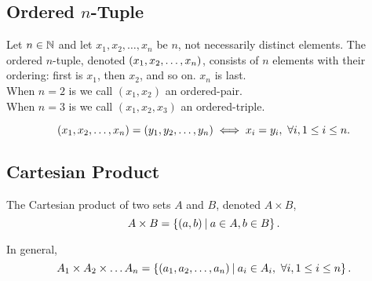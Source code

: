 \documentclass{report}
\begin{document}

\subsection*{Ordered $n$-Tuple}
Let $n\in\mathbb{N}$ and let $x_1, x_2,\dots,x_n$ be $n$, not necessarily distinct elements. The ordered $n$-tuple, denoted $\left( x_1, x_2,\dots,x_n \right)$, consists of $n$ elements with their ordering: first is $x_1$, then $x_2$, and so on. $x_n$ is last. \\

When $n=2$ is we call $(x_1, x_2)$ an ordered-pair.\\
When $n=3$ is we call $(x_1, x_2, x_3)$ an ordered-triple.

$$
	\left( x_1, x_2,\dots,x_n \right) = \left( y_1, y_2,\dots,y_n \right) \iff x_i = y_i,\ \forall i, 1\leq i \leq n.
$$

\subsection*{Cartesian Product}
The Cartesian product of two sets $A$ and $B$, denoted $A\times B$,
$$
	A\times B = \left\lbrace (a,b)\medspace\middle|\medspace a\in A, b\in B \right\rbrace.
$$


In general,
$$
	A_1\times A_2\times \dots A_n = \left\lbrace (a_1, a_2, \dots, a_n)\medspace\middle|\medspace a_i \in A_i,\ \forall i, 1 \leq i \leq n \right\rbrace.
$$
\end{document}
